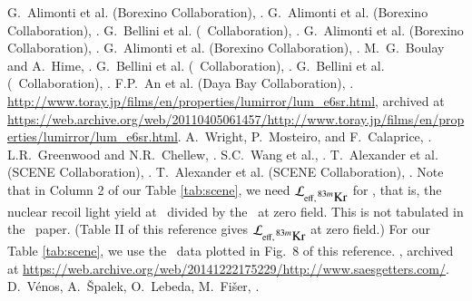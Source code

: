 \documentclass[preprint,12pt]{elsarticle}
\begin{document}
\begin{thebibliography}{00}
G.~Alimonti et al. (Borexino Collaboration), .
G.~Alimonti et al. (Borexino Collaboration), .
G.~Bellini et al. (\bx\ Collaboration), .
G.~Alimonti et al. (Borexino Collaboration), .
G.~Alimonti et al. (Borexino Collaboration), .
M.~G.~Boulay and A.~Hime, .
G.~Bellini et al. (\bx\ Collaboration), .
G.~Bellini et al. (\bx\ Collaboration), .
F.P.~An et al. (Daya Bay Collaboration), .
\url{http://www.toray.jp/films/en/properties/lumirror/lum\_e6sr.html}, archived at \url{https://web.archive.org/web/20110405061457/http://www.toray.jp/films/en/properties/lumirror/lum_e6sr.html}.
 A.~Wright, P.~Mosteiro, and F.~Calaprice, .
 L.R.~Greenwood and N.R.~Chellew, .
 S.C.~Wang et al., .
T.~Alexander et al. (SCENE Collaboration), .
T.~Alexander et al. (SCENE Collaboration), .  Note that in Column 2 of our Table \ref{tab:scene}, we need $\mathcal{L}_{\rm eff,\,\mbox{$^{83m}$Kr}}$ for \dsfdriftfield, that is, the nuclear recoil light yield at \dsfdriftfield\ divided by the  \krthree\ at zero field.  This is not tabulated in the \scene\ paper.  (Table II of this reference gives $\mathcal{L}_{\rm eff,\,\mbox{$^{83m}$Kr}}$ at zero field.)  For our Table \ref{tab:scene}, we use the \dsfdriftfield\ data plotted in Fig.~8 of this reference.
, archived at \url{https://web.archive.org/web/20141222175229/http://www.saesgetters.com/}.
D.~V\'enos, A.~\v{S}palek, O.~Lebeda, M.~Fi\v{s}er, .

\end{thebibliography}
\end{document}
